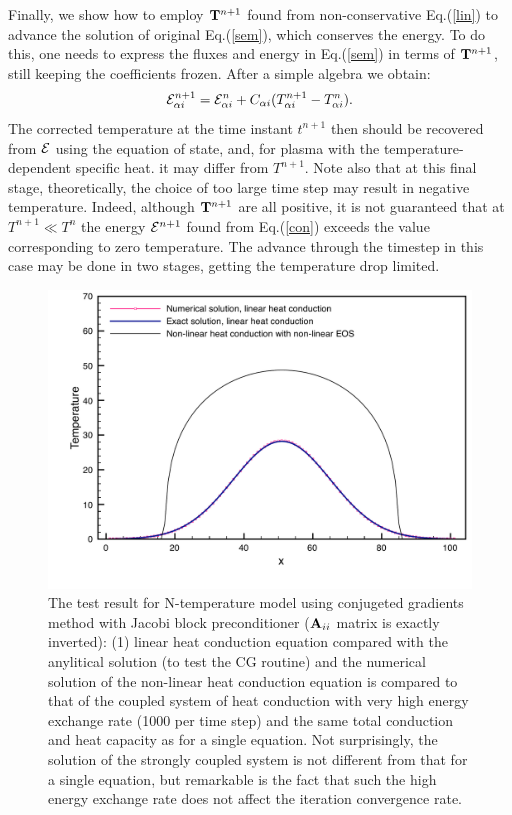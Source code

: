 Finally, we show how to employ ${\bf T}^{n+1}$ found from non-conservative Eq.(\ref{lin}) to advance the solution of original 
Eq.(\ref{sem}), which conserves the energy. To do this, one needs to express the fluxes and energy in Eq.(\ref{sem}) in terms of
${\bf T}^{n+1}$, still keeping the coefficients frozen. After a simple algebra we obtain:
\begin{equation}\label{con}
{\cal E}_{\alpha i}^{n+1} = {\cal E}_{\alpha i}^{n}+C_{\alpha i}(T^{n+1}_{\alpha i}-T^n_{\alpha i}).
\end{equation} 
The corrected temperature at the time instant $t^{n+1}$ then should be recovered from ${\cal E}$ using the equation of state, and,
for plasma with the temperature-dependent specific heat. it may differ from $T^{n+1}$.  
Note also that at this final stage, theoretically, the choice of too large time step may result in negative temperature. Indeed, although ${\bf T}^{n+1}$ 
are all positive, it is not guaranteed that at $T^{n+1}\ll T^{n}$ the energy ${\cal E}^{n+1}$ found from Eq.(\ref{con}) exceeds the value corresponding to
zero temperature. The advance through the timestep in this case may be done in two stages, getting the temperature drop limited.
\begin{figure}
\includegraphics[scale=0.50]{HeatConductionFig.pdf}
\caption{The test result for N-temperature model using conjugeted gradients method with Jacobi block preconditioner (${\bf A}_{ii}$ matrix is 
exactly inverted): (1) linear heat conduction equation compared with the anylitical solution  (to test the CG routine) and the numerical solution 
of the non-linear heat conduction equation is compared to that of the coupled system of heat conduction with very high energy exchange rate 
(1000 per time step) and the same total conduction and heat capacity as for a single equation. Not surprisingly, the solution of the strongly coupled 
system is not different from that for a single equation, but remarkable is the fact that such the high energy exchange rate does not affect
the iteration convergence rate.
}
\label{fig_1}
\end{figure}  

